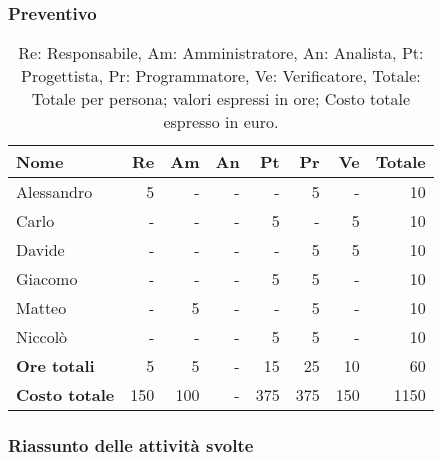 \subsubsection{Preventivo}

\begin{table}[H]
	\centering
	\begin{tabular}{l|r|r|r|r|r|r|r}
		\textbf{Nome}         & \textbf{Re} & \textbf{Am} & \textbf{An} & \textbf{Pt} & \textbf{Pr} & \textbf{Ve} & \textbf{Totale} \\
		\hline
		Alessandro            & 5           & -           & -           & -           & 5           & -           & 10              \\
		Carlo                 & -           & -           & -           & 5           & -           & 5           & 10              \\
		Davide                & -           & -           & -           & -           & 5           & 5           & 10              \\
		Giacomo               & -           & -           & -           & 5           & 5          	& -           & 10              \\
		Matteo                & -           & 5           & -           & -           & 5           & -           & 10              \\
		Niccolò               & -           & -           & -           & 5           & 5           & -           & 10              \\
		\hline
		\textbf{Ore totali}   & 5           & 5           & -           & 15          & 25          & 10          & 60              \\
		\textbf{Costo totale} & 150         & 100         & -           & 375         & 375         & 150         & 1150
	\end{tabular}
	\caption{Re: Responsabile, Am: Amministratore, An: Analista, Pt: Progettista,
		Pr: Programmatore, Ve: Verificatore, Totale: Totale per persona; valori espressi in ore; Costo totale espresso in euro.}
\end{table}

\subsubsection{Riassunto delle attività svolte}

